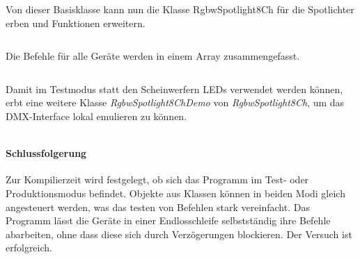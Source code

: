 Von dieser Basisklasse kann nun die Klasse RgbwSpotlight8Ch für die Spotlichter erben und Funktionen erweitern.
\inputminted[linenos=true, breaklines, fontsize=\fontsize{10pt}{10pt}]{cpp}{../src/RgbwSpotlight8Ch.h}

Die Befehle für alle Geräte werden in einem Array zusammengefasst.
\inputminted[linenos=true, breaklines, fontsize=\fontsize{10pt}{10pt}]{cpp}{../src/CommandList.h}

Damit im Testmodus statt den Scheinwerfern LEDs verwendet werden können, erbt eine weitere Klasse \textit{RgbwSpotlight8ChDemo} von \textit{RgbwSpotlight8Ch}, um das DMX-Interface lokal emulieren zu können.
\inputminted[linenos=true, breaklines, fontsize=\fontsize{10pt}{10pt}]{cpp}{../src/RgbwSpotlight8ChDemo.h}

\paragraph{Schlussfolgerung}
Zur Kompilierzeit wird festgelegt, ob sich das Programm im Test- oder Produktionsmodus befindet. Objekte aus Klassen können in beiden Modi gleich angesteuert werden, was das testen von Befehlen stark vereinfacht. Das Programm lässt die Geräte in einer Endlosschleife selbstständig ihre Befehle abarbeiten, ohne dass diese sich durch Verzögerungen blockieren. Der Versuch ist erfolgreich.
